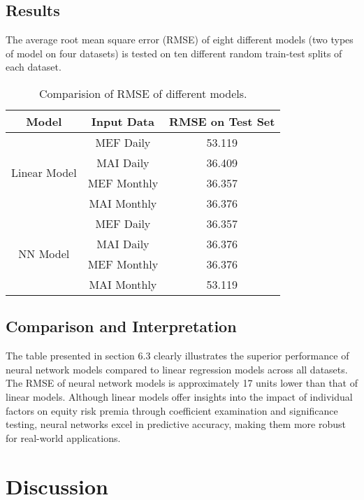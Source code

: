 \documentclass{article}
\begin{document}
\subsection{Results}

The average root mean square error (RMSE) of eight different models (two types of model on four datasets) is tested on ten different random train-test splits of each dataset.

\begin{table}[H]
\centering
\begin{tabular}{|c|c|c|}
\hline
\textbf{Model} & \textbf{Input Data} & \textbf{RMSE on Test Set} \\ \hline
\multirow{4}{*}{Linear Model} & MEF Daily & 53.119 \\ \cline{2-3} 
 & MAI Daily & 36.409 \\ \cline{2-3} 
 & MEF Monthly & 36.357 \\ \cline{2-3} 
 & MAI Monthly & 36.376 \\ \hline
\multirow{4}{*}{NN Model} & MEF Daily & 36.357 \\ \cline{2-3} 
 & MAI Daily & 36.376 \\ \cline{2-3} 
 & MEF Monthly & 36.376 \\ \cline{2-3} 
 & MAI Monthly & 53.119 \\ \hline
\end{tabular}
\caption{Comparision of RMSE of different models.}
\label{tab:my-table}
\end{table}

\subsection{Comparison and Interpretation}

The table presented in section 6.3 clearly illustrates the superior performance of neural network models compared to linear regression models across all datasets. The RMSE of neural network models is approximately 17 units lower than that of linear models. Although linear models offer insights into the impact of individual factors on equity risk premia through coefficient examination and significance testing, neural networks excel in predictive accuracy, making them more robust for real-world applications.

\newpage

\section{Discussion}
\end{document}
